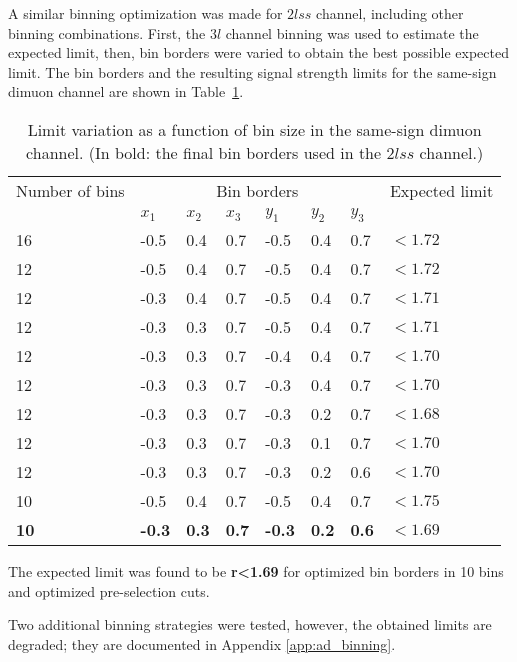 A similar binning optimization was made for $2lss$ channel, including other binning combinations. First, the $3l$ channel binning was used to estimate the expected limit, then, bin borders were varied to obtain the best possible expected limit. The bin borders and the resulting signal strength limits for the same-sign dimuon channel are shown in Table~\ref{bin_limits_2lss}.

\begin{table}[h!]
\centering
\begin{tabular}{llllllll}\hline
Number of bins  & \multicolumn{6}{c}{Bin borders}  & Expected limit \\
                &$x_1$&$x_2$&$x_3$&$y_1$&$y_2$&$y_3$&\\\hline
16              &-0.5 & 0.4 & 0.7 &-0.5 & 0.4 & 0.7 & $<1.72$\\
12              &-0.5 & 0.4 & 0.7 &-0.5 & 0.4 & 0.7 & $<1.72$\\
12              &-0.3 & 0.4 & 0.7 &-0.5 & 0.4 & 0.7 & $<1.71$\\
12              &-0.3 & 0.3 & 0.7 &-0.5 & 0.4 & 0.7 & $<1.71$\\
12              &-0.3 & 0.3 & 0.7 &-0.4 & 0.4 & 0.7 & $<1.70$\\
12              &-0.3 & 0.3 & 0.7 &-0.3 & 0.4 & 0.7 & $<1.70$\\
12              &-0.3 & 0.3 & 0.7 &-0.3 & 0.2 & 0.7 & $<1.68$\\
12              &-0.3 & 0.3 & 0.7 &-0.3 & 0.1 & 0.7 & $<1.70$\\
12              &-0.3 & 0.3 & 0.7 &-0.3 & 0.2 & 0.6 & $<1.70$\\
10              &-0.5 & 0.4 & 0.7 &-0.5 & 0.4 & 0.7 & $<1.75$\\
\textbf{10}     &\textbf{-0.3} &\textbf{ 0.3} &\textbf{ 0.7} &\textbf{-0.3} &\textbf{ 0.2} &\textbf{ 0.6} &$\mathbf{<1.69}$\\\hline
\end{tabular}
\caption[Limit variation as a function of bin size, $2lss$ channel.]{Limit variation as a function of bin size in the same-sign dimuon channel. (In bold: the final bin borders used in the $2lss$ channel.)}
\label{bin_limits_2lss}
\end{table}

The expected limit was found to be \textbf{r<1.69} for optimized bin borders in 10 bins and optimized pre-selection cuts.

Two additional binning strategies were tested, however, the obtained limits are degraded; they are documented in Appendix \ref{app:ad_binning}.   


